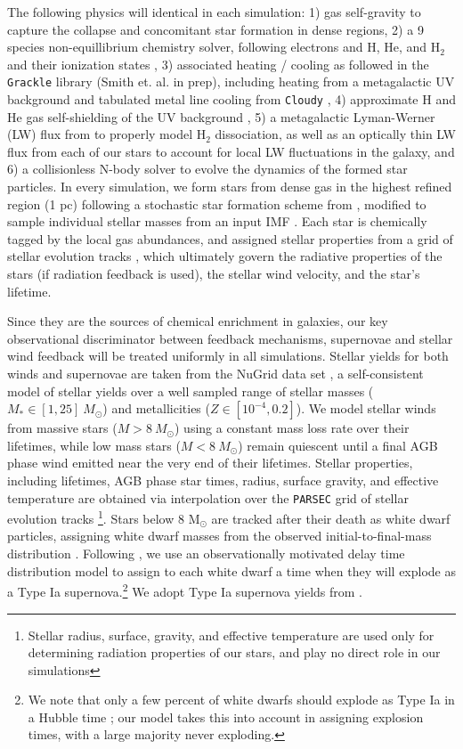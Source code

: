 \documentclass[11pt]{article}
\newcommand{\eg}{e.g.,}
\begin{document}
The following physics will identical in each simulation: 1) gas self-gravity to capture the collapse and concomitant star formation in dense regions, 2) a 9 species non-equillibrium chemistry solver, following electrons and H, He, and H$_{2}$ and their ionization states \citep{Anninos1997, Abel1997}, 3) associated heating / cooling as followed in the \texttt{Grackle} library (Smith et. al. in prep), including heating from a metagalactic UV background \citep{HM2012} and tabulated metal line cooling from \texttt{Cloudy} \citep{Cloudy2013}, 4) approximate H and He gas self-shielding of the UV background \citep{Rahmati2013}, 5) a metagalactic Lyman-Werner (LW) flux from \cite{HM2012} to properly model H$_{2}$ dissociation, as well as an optically thin LW flux from each of our stars to account for local LW fluctuations in the galaxy, and 6) a collisionless N-body solver to evolve the dynamics of the formed star particles. In every simulation, we form stars from dense gas in the highest refined region (1 pc) following a stochastic star formation scheme from \cite{Goldbaum2015, Goldbaum2016}, modified to sample individual stellar masses from an input IMF \citep{Salpeter1955}. Each star is chemically tagged by the local gas abundances, and assigned stellar properties from a grid of stellar evolution tracks \citep{Bressan2012}, which ultimately govern the radiative properties of the stars (if radiation feedback is used), the stellar wind velocity, and the star's lifetime.

Since they are the sources of chemical enrichment in galaxies, our key observational discriminator between feedback mechanisms, supernovae and stellar wind feedback will be treated uniformly in all simulations. Stellar yields for both winds and supernovae are taken from the NuGrid data set \citep[][, Ritter et. al. in prep]{Pignatari2016}, a self-consistent model of stellar yields over a well sampled range of stellar masses ($M_{*} \in [1,25]~M_{\odot}$) and metallicities ($Z\in [10^{-4},0.2]$). We model stellar winds from massive stars ($M > 8~M_{\odot}$) using a constant mass loss rate over their lifetimes, while low mass stars ($M < 8~M_{\odot}$) remain quiescent until a final AGB phase wind emitted near the very end of their lifetimes. Stellar properties, including lifetimes, AGB phase star times, radius, surface gravity, and effective temperature are obtained via interpolation over the \texttt{PARSEC} grid of stellar evolution tracks \citep{Bressan2012}\footnote{Stellar radius, surface, gravity, and effective temperature are used only for determining radiation properties of our stars, and play no direct role in our simulations}. Stars below 8 M$_{\odot}$ are tracked after their death as white dwarf particles, assigning white dwarf masses from the observed initial-to-final-mass distribution \citep{Salaris2009}. Following \citep{Cote2015}, we use an observationally motivated delay time distribution model \citep[\eg][]{Maoz2014} to assign to each white dwarf a time when they will explode as a Type Ia supernova.\footnote{We note that only a few percent of white dwarfs should explode as Type Ia in a Hubble time \citep{Maoz2014}; our model takes this into account in assigning explosion times, with a large majority never exploding.} We adopt Type Ia supernova yields from \cite{Thielemann1986}.
\end{document}
